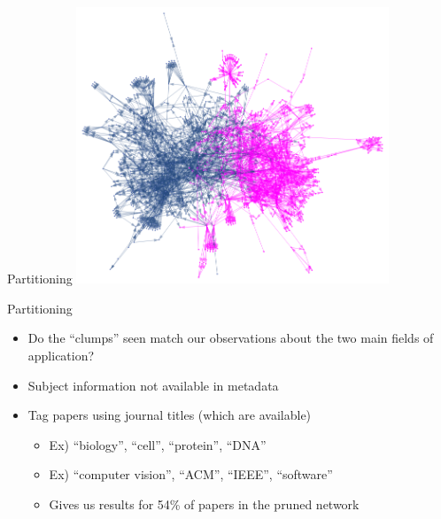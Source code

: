 \documentclass[xcolor=dvipsnames, 14pt]{beamer}
\begin{document}
\begin{frame}{Partitioning}
\centering
\includegraphics[width=0.7\textwidth]{subnetwork_partition.png}
\end{frame}

\begin{frame}{Partitioning}
\begin{itemize}
\item Do the ``clumps'' seen match our observations about the two main fields of application?
\pause
\item Subject information not available in metadata
\pause
\item Tag papers using journal titles (which are available)
\begin{itemize}
\item Ex) ``biology'', ``cell'', ``protein'', ``DNA'' 
\item Ex) ``computer vision'', ``ACM'', ``IEEE'', ``software''
\pause
\item Gives us results for 54\% of papers in the pruned network
\end{itemize}
\end{itemize}
\end{frame}
\end{document}
